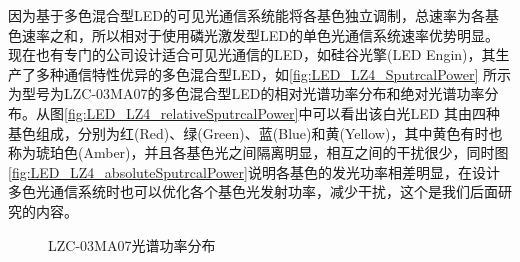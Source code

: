 因为基于多色混合型LED的可见光通信系统能将各基色独立调制，总速率为各基色速率之和，所以相对于使用磷光激发型LED的单色光通信系统速率优势明显。现在也有专门的公司设计适合可见光通信的LED，如硅谷光擎(LED Engin)，其生产了多种通信特性优异的多色混合型LED，如\autoref{fig:LED_LZ4_SputrcalPower} 所示为型号为LZC-03MA07的多色混合型LED的相对光谱功率分布和绝对光谱功率分布。从图\ref{fig:LED_LZ4_relativeSputrcalPower}中可以看出该白光LED 其由四种基色组成，分别为红(Red)、绿(Green)、蓝(Blue)和黄(Yellow)，其中黄色有时也称为琥珀色(Amber)，并且各基色光之间隔离明显，相互之间的干扰很少，同时图\ref{fig:LED_LZ4_absoluteSputrcalPower}说明各基色的发光功率相差明显，在设计多色光通信系统时也可以优化各个基色光发射功率，减少干扰，这个是我们后面研究的内容。
\begin{figure}[h]
    \centering
    \caption{LZC-03MA07光谱功率分布}
    \label{fig:LED_LZ4_SputrcalPower}
\end{figure}


